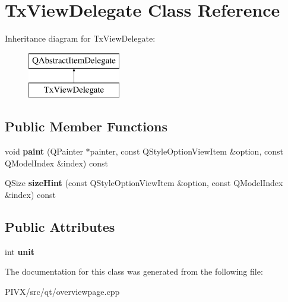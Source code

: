 \hypertarget{class_tx_view_delegate}{}\section{Tx\+View\+Delegate Class Reference}
\label{class_tx_view_delegate}
Inheritance diagram for Tx\+View\+Delegate\+:\begin{figure}[H]
\begin{center}
\leavevmode
\includegraphics[height=2.000000cm]{class_tx_view_delegate}
\end{center}
\end{figure}
\subsection*{Public Member Functions}
\begin{DoxyCompactItemize}
\item 
\mbox{\label{class_tx_view_delegate_aeb314283e3a3fae5099d95c7b3309d57}} 
void {\bfseries paint} (Q\+Painter $\ast$painter, const Q\+Style\+Option\+View\+Item \&option, const Q\+Model\+Index \&index) const
\item 
\mbox{\label{class_tx_view_delegate_aff22f5cc2236638043688dbc1644c44e}} 
Q\+Size {\bfseries size\+Hint} (const Q\+Style\+Option\+View\+Item \&option, const Q\+Model\+Index \&index) const
\end{DoxyCompactItemize}
\subsection*{Public Attributes}
\begin{DoxyCompactItemize}
\item 
\mbox{\label{class_tx_view_delegate_a4281e394dd7e90ecd8401fdca7b0413a}} 
int {\bfseries unit}
\end{DoxyCompactItemize}


The documentation for this class was generated from the following file\+:\begin{DoxyCompactItemize}
\item 
P\+I\+V\+X/src/qt/overviewpage.\+cpp\end{DoxyCompactItemize}
